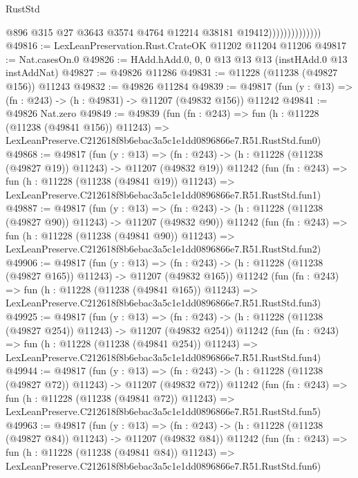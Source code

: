 \begin{lexlean}{RustStd}
\begin{coremodule}
                                @896
                                @315
                                @27
                                @3643
                                @3574
                                @4764
                                @12214
                                @38181
                                @19412))))))))))))))
@49816 := LexLeanPreservation.Rust.CrateOK @11202 @11204 @11206
@49817 := Nat.casesOn.{0}
@49826 := HAdd.hAdd.{0, 0, 0} @13 @13 @13 (instHAdd.{0} @13 instAddNat)
@49827 := @49826 @11286
@49831 := @11228 (@11238 (@49827 @156)) @11243
@49832 := @49826 @11284
@49839 := @49817 (fun (y : @13) => (fn : @243) -> (h : @49831) -> @11207 (@49832 @156)) @11242
@49841 := @49826 Nat.zero
@49849 := @49839
    (fun (fn : @243) =>
    fun (h : @11228 (@11238 (@49841 @156)) @11243) =>
    LexLeanPreserve.C212618f8b6ebac3a5c1e1dd0896866e7.R51.RustStd.fun0)
@49868 := @49817
    (fun (y : @13) =>
    (fn : @243) -> (h : @11228 (@11238 (@49827 @19)) @11243) -> @11207 (@49832 @19))
    @11242
    (fun (fn : @243) =>
    fun (h : @11228 (@11238 (@49841 @19)) @11243) =>
    LexLeanPreserve.C212618f8b6ebac3a5c1e1dd0896866e7.R51.RustStd.fun1)
@49887 := @49817
    (fun (y : @13) =>
    (fn : @243) -> (h : @11228 (@11238 (@49827 @90)) @11243) -> @11207 (@49832 @90))
    @11242
    (fun (fn : @243) =>
    fun (h : @11228 (@11238 (@49841 @90)) @11243) =>
    LexLeanPreserve.C212618f8b6ebac3a5c1e1dd0896866e7.R51.RustStd.fun2)
@49906 := @49817
    (fun (y : @13) =>
    (fn : @243) -> (h : @11228 (@11238 (@49827 @165)) @11243) -> @11207 (@49832 @165))
    @11242
    (fun (fn : @243) =>
    fun (h : @11228 (@11238 (@49841 @165)) @11243) =>
    LexLeanPreserve.C212618f8b6ebac3a5c1e1dd0896866e7.R51.RustStd.fun3)
@49925 := @49817
    (fun (y : @13) =>
    (fn : @243) -> (h : @11228 (@11238 (@49827 @254)) @11243) -> @11207 (@49832 @254))
    @11242
    (fun (fn : @243) =>
    fun (h : @11228 (@11238 (@49841 @254)) @11243) =>
    LexLeanPreserve.C212618f8b6ebac3a5c1e1dd0896866e7.R51.RustStd.fun4)
@49944 := @49817
    (fun (y : @13) =>
    (fn : @243) -> (h : @11228 (@11238 (@49827 @72)) @11243) -> @11207 (@49832 @72))
    @11242
    (fun (fn : @243) =>
    fun (h : @11228 (@11238 (@49841 @72)) @11243) =>
    LexLeanPreserve.C212618f8b6ebac3a5c1e1dd0896866e7.R51.RustStd.fun5)
@49963 := @49817
    (fun (y : @13) =>
    (fn : @243) -> (h : @11228 (@11238 (@49827 @84)) @11243) -> @11207 (@49832 @84))
    @11242
    (fun (fn : @243) =>
    fun (h : @11228 (@11238 (@49841 @84)) @11243) =>
    LexLeanPreserve.C212618f8b6ebac3a5c1e1dd0896866e7.R51.RustStd.fun6)

\end{coremodule}
\end{lexlean}
